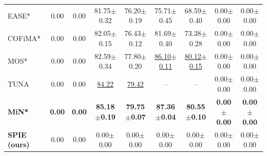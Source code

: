 \begin{table}[t]
{\begin{tabular}{lcccccccc}
EASE*
& 0.00 & 0.00
& 81.75$\pm$0.32 & 76.20$\pm$0.19
& 75.71$\pm$0.45 & 68.59$\pm$0.40
& 0.00$\pm$0.00 & 0.00$\pm$0.00 \\

COFiMA*
& 0.00 & 0.00
& 82.05$\pm$0.15 & 76.43$\pm$0.12
& 81.69$\pm$0.40 & 73.38$\pm$0.28
& 0.00$\pm$0.00 & 0.00$\pm$0.00 \\

MOS*
& 0.00 & 0.00
& 82.59$\pm$0.34 & 77.80$\pm$0.20
& \underline{86.10$\pm$0.11} & \underline{80.12$\pm$0.15}
& 0.00$\pm$0.00 & 0.00$\pm$0.00 \\

TUNA
& 0.00 & 0.00
& \underline{84.22} & \underline{79.42}
& -- & --
& 0.00$\pm$0.00 & 0.00$\pm$0.00 \\

\textbf{MiN*}
& \textbf{0.00} & \textbf{0.00}
& \textbf{85.18$\pm$0.19} & \textbf{79.75$\pm$0.07}
& \textbf{87.36$\pm$0.04} & \textbf{80.55$\pm$0.10}
& \textbf{0.00$\pm$0.00} & \textbf{0.00$\pm$0.00} \\

\midrule
\textbf{SPIE (ours)}
& 0.00 & 0.00
& 0.00$\pm$0.00 & 0.00$\pm$0.00
& 0.00$\pm$0.00 & 0.00$\pm$0.00
& 0.00$\pm$0.00 & 0.00$\pm$0.00 \\

\bottomrule
\end{tabular}%
}
\end{table}



